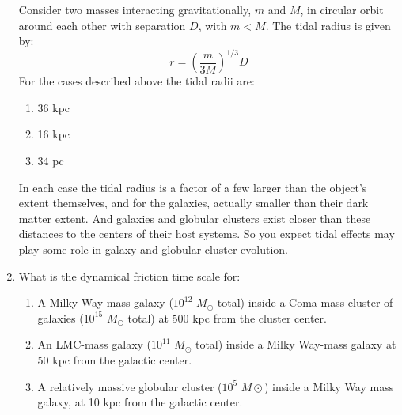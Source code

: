 \begin{enumerate}
\begin{answer}
Consider two masses interacting gravitationally, $m$ and $M$, in
circular orbit around each other with separation $D$, with
$m<M$. The tidal radius is given by:
\begin{equation}
r = \left(\frac{m}{3M}\right)^{1/3} D
\end{equation}
For the cases described above the tidal radii are:
\begin{enumerate}
\item 36 kpc
\item 16 kpc
\item 34 pc 
\end{enumerate}
In each case the tidal radius is a factor of a few larger than the
object's extent themselves, and for the galaxies, actually smaller
than their dark matter extent. And galaxies and globular clusters
exist closer than these distances to the centers of their host
systems. So you expect tidal effects may play some role in galaxy and
globular cluster evolution.
\end{answer}

\item What is the dynamical friction time scale for:
\begin{enumerate}
\item A Milky Way mass galaxy ($10^{12}$ $M_\odot$ total) inside a
Coma-mass cluster of galaxies ($10^{15}$ $M_\odot$ total)
at 500 kpc from the cluster center.
\item An LMC-mass galaxy ($10^{11}$ $M_\odot$ total) inside a
Milky Way-mass galaxy at 50 kpc from
the galactic center.
\item A relatively massive globular cluster ($10^5$ $M\odot$) inside a
Milky Way mass galaxy, at 10 kpc from the galactic center.
\end{enumerate}


\end{enumerate}
